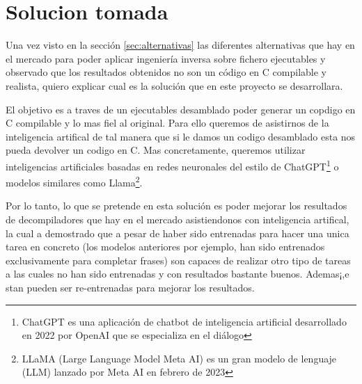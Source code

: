 \section{Solucion tomada}
\label{sec:solucion}

Una vez visto en la sección \ref{sec:alternativas} las diferentes alternativas que hay en el mercado para poder aplicar ingeniería inversa sobre fichero ejecutables y observado que los
resultados obtenidos no son un código en C compilable y realista, quiero explicar cual es la solución que en este proyecto se desarrollara.

El objetivo es a traves de un ejecutables desamblado poder generar un copdigo en C compilable y lo mas fiel al original. Para ello queremos de asistirnos de la inteligencia artifical
de tal manera que si le damos un codigo desamblado esta nos pueda devolver un codigo en C. Mas concretamente, queremos utilizar inteligencias artificiales basadas en redes neuronales
del estilo de ChatGPT\footnote{ChatGPT es una aplicación de chatbot de inteligencia artificial desarrollado en 2022 por OpenAI que se especializa en el diálogo} o modelos similares
como Llama\footnote{LLaMA (Large Language Model Meta AI) es un gran modelo de lenguaje (LLM) lanzado por Meta AI en febrero de 2023}.

Por lo tanto, lo que se pretende en esta solución es poder mejorar los resultados de decompiladores que hay en el mercado asistiendonos con inteligencia artifical, la cual a demostrado
que a pesar de haber sido entrenadas para hacer una unica tarea en concreto (los modelos anteriores por ejemplo, han sido entrenados exclusivamente para completar frases) son capaces de
realizar otro tipo de tareas a las cuales no han sido entrenadas y con resultados bastante buenos. Ademas¡,e stan pueden ser re-entrenadas para mejorar los resultados.
